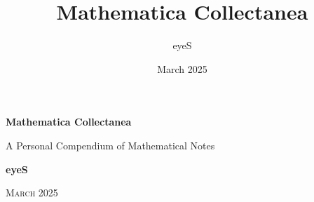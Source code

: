 \documentclass{article}
\title{Mathematica Collectanea}
\author{eyeS}
\date{March 2025}
\begin{document}
\begin{titlepage}
    \centering
    \vspace*{3cm}
    {\Huge \bfseries Mathematica Collectanea \par}
    \vspace{0.5cm}
    {\large A Personal Compendium of Mathematical Notes\par}
    \vfill
    {\LARGE \bfseries eyeS\par}
    \vspace{0.5cm}
    {\Large \textsc{March 2025}}
\end{titlepage}

\tableofcontents
\clearpage


\end{document}
